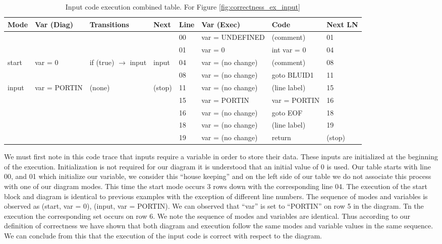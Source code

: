 \begin{table}[htcb]
	\caption{Input code execution combined table. For Figure \ref{fig:correctness_ex_input}}
	\centering
	\tablefontsize
		\begin{tabular}{| p{} | p{} | p{} | p{} | p{} | p{} | p{} | p{} |}
			\hline
			\textbf{Mode} 		&	\textbf{Var (Diag)} 		& 	\textbf{Transitions} 		& 	\textbf{Next}		&	\textbf{Line}		&	\textbf{Var (Exec)	}	&	\textbf{Code}	&	\textbf{Next LN} \\
			\hline			
								&								&								&						&	00					& 	var = UNDEFINED			&	(comment)		&	01	\\
			\hline
								&								&								&						&	01					&	var = 0					&	int var = 0		&	04	\\
			\hline
			start 				&	var = 0						&if (true) $\rightarrow$ input	&	input				&	04					&	var = (no change)		& 	(comment)		&	08	\\
			\hline
								&								&								&						&	08					&	var = (no change)		&	goto BLUID1		&	11	\\
			\hline
			input				&	var = PORTIN				&	(none)						&	(stop)				&	11					&	var = (no change)		&	(line label)	&	15	\\
			\hline
								&								&								&						&	15					&	var = PORTIN			&	var = PORTIN	&	16	\\
			\hline
								&								&								&						&	16					&	var = (no change)		&	goto EOF		&	18	\\
			\hline
								&								&								&						&	18					&	var = (no change)		&	(line label)	&	19	\\
			\hline
								&								&								&						&	19					&	var = (no change)		&	return			&	(stop)	\\
			\hline
		\end{tabular}
	\label{table:InputExecCombined}
\end{table}

We must first note in this code trace that inputs require a variable in order to store
their data. These inputs are initialized at the beginning of the execution. 
Initialization is not required for our diagram it is understood that an initial
value of 0 is used. Our table starts with line 00, and 01 which initialize 
our variable, we consider this ``house keeping'' and on the left side of our table we
do not associate this process with one of our diagram modes. This time the start
mode occurs 3 rows down with the corresponding line 04. The execution of the start block 
and diagram is identical to previous examples with the exception of different line numbers.
The sequence of modes and variables is observed as {(start, var = 0), (input, var = PORTIN)}.
We can observed that ``var'' is set to ``PORTIN'' on row 5 in the diagram. Tn the 
execution the corresponding set occurs on row 6. We note the sequence of modes and variables are identical.
Thus according to our definition of correctness we have shown that both diagram
and execution follow the same modes and variable values in the same sequence. 
We can conclude from this that the execution of the input code is correct
with respect to the diagram.

